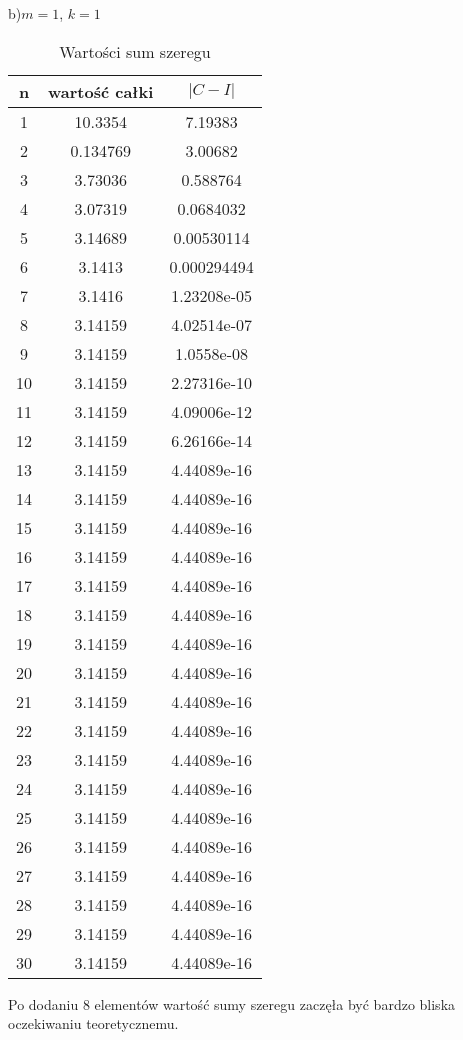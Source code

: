 \documentclass{article}
\begin{document}
\newpage
b)$m=1$, $k=1$
\begin{table}[H]
\centering
\begin{tabular}{|c|c|c|}
n& wartość całki & $|C−I|$ \\
\hline
1 & 10.3354 & 7.19383\\
2 & 0.134769 & 3.00682\\
3 & 3.73036 & 0.588764\\
4 & 3.07319 & 0.0684032\\
5 & 3.14689 & 0.00530114\\
6 & 3.1413 & 0.000294494\\
7 & 3.1416 & 1.23208e-05\\
8 & 3.14159 & 4.02514e-07\\
9 & 3.14159 & 1.0558e-08\\
10 & 3.14159 & 2.27316e-10\\
11 & 3.14159 & 4.09006e-12\\
12 & 3.14159 & 6.26166e-14\\
13 & 3.14159 & 4.44089e-16\\
14 & 3.14159 & 4.44089e-16\\
15 & 3.14159 & 4.44089e-16\\
16 & 3.14159 & 4.44089e-16\\
17 & 3.14159 & 4.44089e-16\\
18 & 3.14159 & 4.44089e-16\\
19 & 3.14159 & 4.44089e-16\\
20 & 3.14159 & 4.44089e-16\\
21 & 3.14159 & 4.44089e-16\\
22 & 3.14159 & 4.44089e-16\\
23 & 3.14159 & 4.44089e-16\\
24 & 3.14159 & 4.44089e-16\\
25 & 3.14159 & 4.44089e-16\\
26 & 3.14159 & 4.44089e-16\\
27 & 3.14159 & 4.44089e-16\\
28 & 3.14159 & 4.44089e-16\\
29 & 3.14159 & 4.44089e-16\\
30 & 3.14159 & 4.44089e-16

\end{tabular}
\caption{Wartości sum szeregu}
\end{table}
Po dodaniu 8 elementów wartość sumy szeregu zaczęła być bardzo bliska oczekiwaniu teoretycznemu.
\end{document}
